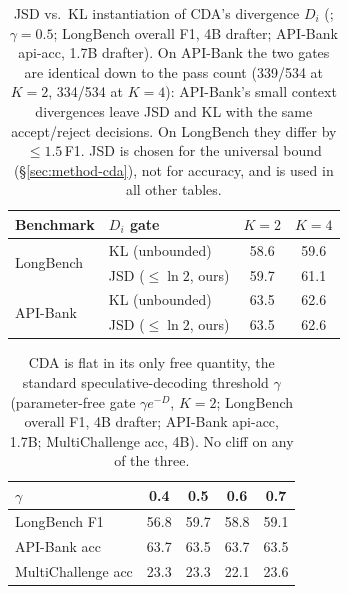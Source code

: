 \documentclass[11pt]{article}
\theoremstyle{plain}
\theoremstyle{definition}
\begin{document}
\begin{table}[!h]
\centering
\footnotesize
\setlength{\tabcolsep}{6pt}
\begin{tabular}{llcc}
\toprule
Benchmark & $D_i$ gate & $K{=}2$ & $K{=}4$ \\
\midrule
\multirow{2}{*}{LongBench} & KL (unbounded)         & 58.6 & 59.6 \\
                           & JSD ($\le\ln 2$, ours) & 59.7 & 61.1 \\
\midrule
\multirow{2}{*}{API-Bank}  & KL (unbounded)         & 63.5 & 62.6 \\
                           & JSD ($\le\ln 2$, ours) & 63.5 & 62.6 \\
\bottomrule
\end{tabular}
\caption{JSD vs.\ KL instantiation of CDA's divergence $D_i$ (; $\gamma{=}0.5$; LongBench overall F1, 4B drafter; API-Bank api-acc, 1.7B drafter). On API-Bank the two gates are identical down to the pass count (339/534 at $K{=}2$, 334/534 at $K{=}4$): API-Bank's small context divergences leave JSD and KL with the same accept/reject decisions. On LongBench they differ by $\le1.5$\,F1. JSD is chosen for the universal bound (\S\ref{sec:method-cda}), not for accuracy, and is used in all other tables.}
\label{tab:jsdkl}
\end{table}

\begin{table}[h]
\centering
\footnotesize
\setlength{\tabcolsep}{8pt}
\begin{tabular}{lcccc}
\toprule
$\gamma$ & 0.4 & 0.5 & 0.6 & 0.7 \\
\midrule
LongBench F1       & 56.8 & 59.7 & 58.8 & 59.1 \\
API-Bank acc       & 63.7 & 63.5 & 63.7 & 63.5 \\
MultiChallenge acc & 23.3 & 23.3 & 22.1 & 23.6 \\
\bottomrule
\end{tabular}
\caption{CDA is flat in its only free quantity, the standard speculative-decoding threshold $\gamma$ (parameter-free gate $\gamma e^{-D}$, $K{=}2$; LongBench overall F1, 4B drafter; API-Bank api-acc, 1.7B; MultiChallenge acc, 4B). No cliff on any of the three.}
\label{tab:gamma_robust}
\end{table}
\end{document}
